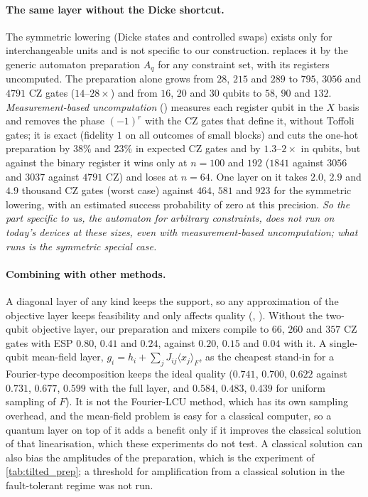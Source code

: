 \paragraph{The same layer without the Dicke shortcut.} The symmetric lowering (Dicke states and controlled swaps) exists only for interchangeable units and is not specific to our construction.  replaces it by the generic automaton preparation $A_q$ for any constraint set, with its registers uncomputed. The preparation alone grows from $28$, $215$ and $289$ to $795$, $3056$ and $4791$ CZ gates ($14$--$28\times$) and from $16$, $20$ and $30$ qubits to $58$, $90$ and $132$. \emph{Measurement-based uncomputation} () measures each register qubit in the $X$ basis and removes the phase $(-1)^r$ with the CZ gates that define it, without Toffoli gates; it is exact (fidelity $1$ on all outcomes of small blocks) and cuts the one-hot preparation by $38\%$ and $23\%$ in expected CZ gates and by $1.3$--$2\times$ in qubits, but against the binary register it wins only at $n=100$ and $192$ ($1841$ against $3056$ and $3037$ against $4791$ CZ) and loses at $n=64$. One layer on it takes $2.0$, $2.9$ and $4.9$ thousand CZ gates (worst case) against $464$, $581$ and $923$ for the symmetric lowering, with an estimated success probability of zero at this precision. \emph{So the part specific to us, the automaton for arbitrary constraints, does not run on today's devices at these sizes, even with measurement-based uncomputation; what runs is the symmetric special case.}


\paragraph{Combining with other methods.} A diagonal layer of any kind keeps the support, so any approximation of the objective layer keeps feasibility and only affects quality (, ). Without the two-qubit objective layer, our preparation and mixers compile to $66$, $260$ and $357$ CZ gates with ESP $0.80$, $0.41$ and $0.24$, against $0.20$, $0.15$ and $0.04$ with it. A single-qubit mean-field layer, $g_i=h_i+\sum_jJ_{ij}\langle x_j\rangle_F$, as the cheapest stand-in for a Fourier-type decomposition keeps the ideal quality ($0.741$, $0.700$, $0.622$ against $0.731$, $0.677$, $0.599$ with the full layer, and $0.584$, $0.483$, $0.439$ for uniform sampling of $F$). It is not the Fourier-LCU method, which has its own sampling overhead, and the mean-field problem is easy for a classical computer, so a quantum layer on top of it adds a benefit only if it improves the classical solution of that linearisation, which these experiments do not test. A classical solution can also bias the amplitudes of the preparation, which is the experiment of \cref{tab:tilted_prep}; a threshold for amplification from a classical solution in the fault-tolerant regime was not run.
